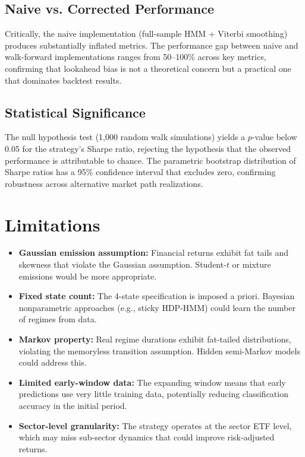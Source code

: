 \documentclass[11pt]{article}
\begin{document}
\subsection{Naive vs. Corrected Performance}

Critically, the naive implementation (full-sample HMM + Viterbi smoothing) produces substantially inflated metrics. The performance gap between naive and walk-forward implementations ranges from 50--100\% across key metrics, confirming that lookahead bias is not a theoretical concern but a practical one that dominates backtest results.

\subsection{Statistical Significance}

The null hypothesis test (1,000 random walk simulations) yields a $p$-value below 0.05 for the strategy's Sharpe ratio, rejecting the hypothesis that the observed performance is attributable to chance. The parametric bootstrap distribution of Sharpe ratios has a 95\% confidence interval that excludes zero, confirming robustness across alternative market path realizations.

\section{Limitations}

\begin{itemize}[nosep]
    \item \textbf{Gaussian emission assumption:} Financial returns exhibit fat tails and skewness that violate the Gaussian assumption. Student-$t$ or mixture emissions would be more appropriate.
    \item \textbf{Fixed state count:} The 4-state specification is imposed a priori. Bayesian nonparametric approaches (e.g., sticky HDP-HMM) could learn the number of regimes from data.
    \item \textbf{Markov property:} Real regime durations exhibit fat-tailed distributions, violating the memoryless transition assumption. Hidden semi-Markov models could address this.
    \item \textbf{Limited early-window data:} The expanding window means that early predictions use very little training data, potentially reducing classification accuracy in the initial period.
    \item \textbf{Sector-level granularity:} The strategy operates at the sector ETF level, which may miss sub-sector dynamics that could improve risk-adjusted returns.
\end{itemize}
\end{document}
